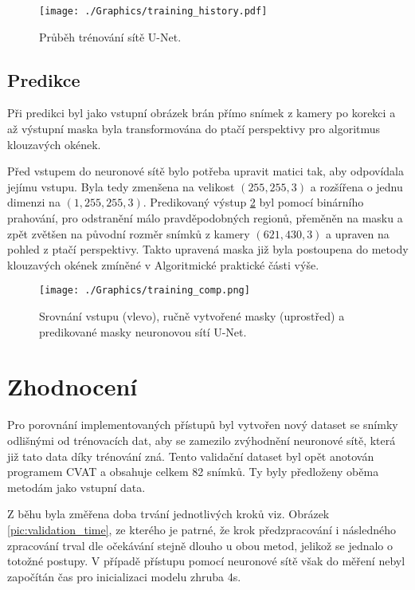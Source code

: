 \documentclass[czech, bc, kky, he, iso690numb]{fasthesis}
\begin{document}
        			\begin{figure}[h]
        				\centering
        				\texttt{[image: ./Graphics/training\_history.pdf]}
        				\caption{Průběh trénování sítě U-Net.}
        				\label{pic:training_hist}
        			\end{figure}
        			
        	\subsection{Predikce}
        		Při predikci byl jako vstupní obrázek brán přímo snímek z kamery po korekci a až výstupní maska byla transformována do ptačí perspektivy pro algoritmus klouzavých okének.
        		
        		Před vstupem do neuronové sítě bylo potřeba upravit matici tak, aby odpovídala jejímu vstupu. Byla tedy zmenšena na velikost \((255, 255, 3)\) a rozšířena o jednu dimenzi na \((1, 255, 255, 3)\). Predikovaný výstup \ref{pic:template_comp} byl pomocí binárního prahování, pro odstranění málo pravděpodobných regionů, přeměněn na masku a zpět zvětšen na původní rozměr snímků z kamery \((621, 430, 3)\) a upraven na pohled z ptačí perspektivy. Takto upravená maska již byla postoupena do metody klouzavých okének zmíněné v Algoritmické praktické části výše.
        		
	        		\begin{figure}[h]
	        			\centering
	        			\texttt{[image: ./Graphics/training\_comp.png]}
	        			\caption{Srovnání vstupu (vlevo), ručně vytvořené masky (uprostřed) a predikované masky neuronovou sítí U-Net.}
	        			\label{pic:template_comp}
	        		\end{figure}
        		
        \section{Zhodnocení}
        	Pro porovnání implementovaných přístupů byl vytvořen nový dataset se snímky odlišnými od trénovacích dat, aby se zamezilo zvýhodnění neuronové sítě, která již tato data díky trénování zná. Tento validační dataset byl opět anotován programem CVAT a obsahuje celkem 82 snímků. Ty byly předloženy oběma metodám jako vstupní data.
        	
        	Z běhu byla změřena doba trvání jednotlivých kroků viz. Obrázek \ref{pic:validation_time}, ze kterého je patrné, že krok předzpracování i následného zpracování trval dle očekávání stejně dlouho u obou metod, jelikož se jednalo o totožné postupy. V případě přístupu pomocí neuronové sítě však do měření nebyl započítán čas pro inicializaci modelu zhruba 4s.
        	
\end{document}
